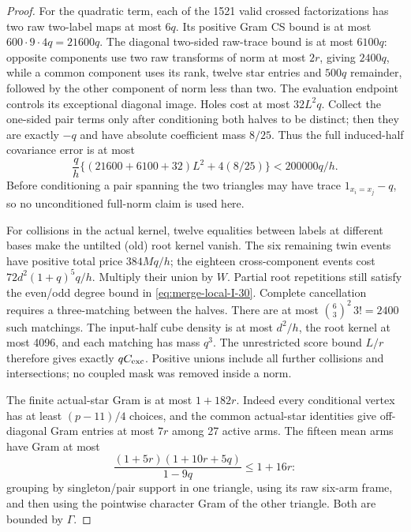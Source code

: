 \begin{proof}
For the quadratic term, each of the 1521 valid crossed
factorizations has two raw two-label maps at most $6q$.
Its positive Gram CS bound is at most
$600\cdot9\cdot4q=21600q$. The diagonal two-sided raw-trace
bound is at most $6100q$: opposite components use two raw
transforms of norm at most $2r$, giving $2400q$, while a
common component uses its rank,
twelve star entries and $500q$ remainder, followed by
the other component of norm less than two.
The evaluation endpoint controls its exceptional diagonal
image. Holes cost at most $32L^2q$.
Collect the one-sided pair terms only after conditioning
both halves to be distinct; then they are exactly $-q$
and have absolute coefficient mass $8/25$.
Thus the full induced-half covariance error is at most
\begin{equation}\label{eq:merge-local-I-40}
 \frac qh\{(21600+6100+32)L^2+4(8/25)\}
 <200000q/h.
\end{equation}
Before conditioning a pair spanning the two triangles may
have trace $1_{x_i=x_j}-q$, so no unconditioned full-norm
claim is used here.

For collisions in the actual kernel, twelve equalities between
labels at different bases make the untilted (old) root kernel
vanish. The six remaining twin events
have positive total price $384Mq/h$; the eighteen
cross-component events cost $72d^2(1+q)^5q/h$.
Multiply their union by $W$. Partial root repetitions
still satisfy the even/odd degree bound in \eqref{eq:merge-local-I-30}.
Complete cancellation requires a three-matching between
the halves. There are at most
$\binom63^2\,3!=2400$ such matchings. The input-half cube
density is at most $d^2/h$, the root kernel at most 4096,
and each matching has mass $q^3$. The unrestricted score
bound $L/r$ therefore gives exactly $qC_{\rm exc}$.
Positive unions include all further collisions and
intersections; no coupled mask was removed inside a norm.

The finite actual-star Gram is at most $1+182r$.
Indeed every conditional vertex has at least $(p-11)/4$
choices, and the common actual-star identities give
off-diagonal Gram entries at most $7r$ among 27 active arms.
The fifteen mean arms have Gram at most
\begin{equation}\label{eq:merge-local-I-41}
 \frac{(1+5r)(1+10r+5q)}{1-9q}\le1+16r:
\end{equation}
grouping by singleton/pair support in one triangle, using its
raw six-arm frame, and then using the pointwise character Gram of
the other triangle. Both are bounded by $\Gamma$.


\end{proof}

